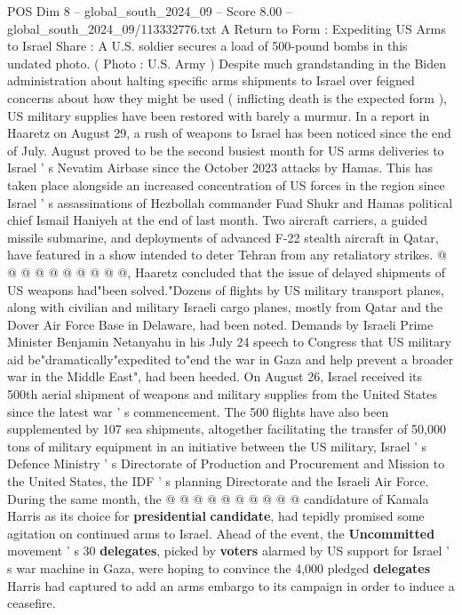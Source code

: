 \begin{textsample}{POS Dim 8 – global\_south\_2024\_09 – Score 8.00 – global\_south\_2024\_09/113332776.txt}  \label{ex:f8_pos_251}
A Return to Form : Expediting US Arms to Israel Share : A U.S. soldier secures a load of 500-pound bombs in this undated photo. ( Photo : U.S.
Army ) Despite much grandstanding in the Biden administration about halting specific arms shipments to Israel over feigned concerns about how they might be used ( inflicting death is the expected form ), US military supplies have been restored with barely a murmur.
In a report in Haaretz on August 29, a rush of weapons to Israel has been noticed since the end of July.
August proved to be the second busiest month for US arms deliveries to Israel ' s Nevatim Airbase since the October 2023 attacks by Hamas.
This has taken place alongside an increased concentration of US forces in the region since Israel ' s assassinations of Hezbollah commander Fuad Shukr and Hamas political chief Ismail Haniyeh at the end of last month.
Two aircraft carriers, a guided missile submarine, and deployments of advanced F-22 stealth aircraft in Qatar, have featured in a show intended to deter Tehran from any retaliatory strikes. @ @ @ @ @ @ @ @ @ @, Haaretz concluded that the issue of delayed shipments of US weapons had"been solved."Dozens of flights by US military transport planes, along with civilian and military Israeli cargo planes, mostly from Qatar and the Dover Air Force Base in Delaware, had been noted.
Demands by Israeli Prime Minister Benjamin Netanyahu in his July 24 speech to Congress that US military aid be"dramatically"expedited to"end the war in Gaza and help prevent a broader war in the Middle East", had been heeded.
On August 26, Israel received its 500th aerial shipment of weapons and military supplies from the United States since the latest war ' s commencement.
The 500 flights have also been supplemented by 107 sea shipments, altogether facilitating the transfer of 50,000 tons of military equipment in an initiative between the US military, Israel ' s Defence Ministry ' s Directorate of Production and Procurement and Mission to the United States, the IDF ' s planning Directorate and the Israeli Air Force.
During the same month, the @ @ @ @ @ @ @ @ @ @ candidature of Kamala Harris as its choice for \textbf{presidential} \textbf{candidate}, had tepidly promised some agitation on continued arms to Israel.
Ahead of the event, the \textbf{Uncommitted} movement ' s 30 \textbf{delegates}, picked by \textbf{voters} alarmed by US support for Israel ' s war machine in Gaza, were hoping to convince the 4,000 pledged \textbf{delegates} Harris had captured to add an arms embargo to its campaign in order to induce a ceasefire.

\end{textsample}
